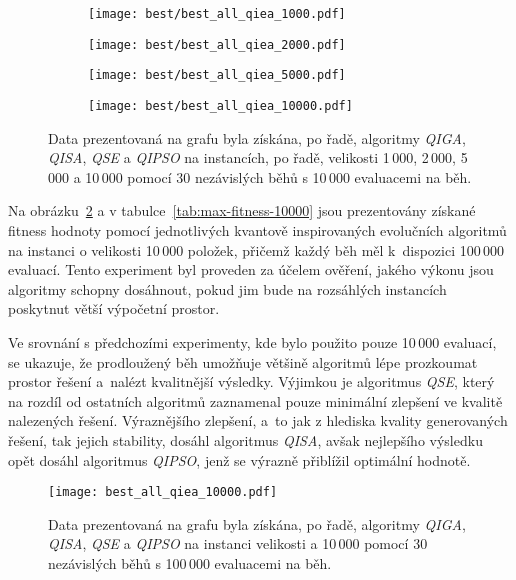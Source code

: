 \begin{figure}[ht!]
    \centering
    \begin{subfigure}[b]{0.48\textwidth}
      \texttt{[image: best/best\_all\_qiea\_1000.pdf]}
    \end{subfigure}
    \hfill
    \begin{subfigure}[b]{0.48\textwidth}
        \texttt{[image: best/best\_all\_qiea\_2000.pdf]}
    \end{subfigure}

    \begin{subfigure}[b]{0.48\textwidth}
      \texttt{[image: best/best\_all\_qiea\_5000.pdf]}
    \end{subfigure}
    \hfill
    \begin{subfigure}[b]{0.48\textwidth}
        \texttt{[image: best/best\_all\_qiea\_10000.pdf]}
    \end{subfigure}
    \caption{Data prezentovaná na grafu byla získána, po řadě, algoritmy \emph{QIGA}, \emph{QISA}, \emph{QSE} a \emph{QIPSO} na instancích, po řadě, velikosti 1\,000, 2\,000, 5\,000 a 10\,000 pomocí 30 nezávislých běhů s 10\,000 evaluacemi na běh.}
    \label{fig:best-10k}
\end{figure}

Na obrázku~\ref{fig:best-100k} a v tabulce~\ref{tab:max-fitness-10000} jsou prezentovány získané fitness hodnoty pomocí jednotlivých kvantově inspirovaných evolučních algoritmů na instanci o velikosti 10\,000 položek, přičemž každý běh měl k~dispozici 100\,000 evaluací.
Tento experiment byl proveden za účelem ověření, jakého výkonu jsou algoritmy schopny dosáhnout, pokud jim bude na rozsáhlých instancích poskytnut větší výpočetní prostor.

Ve srovnání s předchozími experimenty, kde bylo použito pouze 10\,000 evaluací, se ukazuje, že prodloužený běh umožňuje většině algoritmů lépe prozkoumat prostor řešení a~nalézt kvalitnější výsledky. 
Výjimkou je algoritmus \emph{QSE}, který na rozdíl od ostatních algoritmů zaznamenal pouze minimální zlepšení ve kvalitě nalezených řešení. 
Výraznějšího zlepšení, a~to jak z hlediska kvality generovaných řešení, tak jejich stability, dosáhl algoritmus \emph{QISA}, avšak nejlepšího výsledku opět dosáhl algoritmus \emph{QIPSO}, jenž se výrazně přiblížil optimální hodnotě. 

\begin{figure}[ht!]
    \centering
    \texttt{[image: best\_all\_qiea\_10000.pdf]}
    \caption{Data prezentovaná na grafu byla získána, po řadě, algoritmy \emph{QIGA}, \emph{QISA}, \emph{QSE} a \emph{QIPSO} na instanci velikosti a 10\,000 pomocí 30 nezávislých běhů s 100\,000 evaluacemi na běh.}
    \label{fig:best-100k}
\end{figure}

